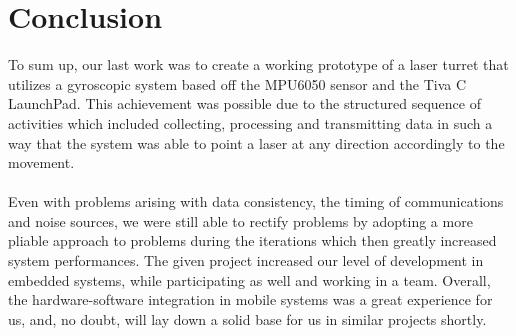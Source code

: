 \documentclass[12pt, a4paper]{article}
\begin{document}
\section{Conclusion}
To sum up, our last work was to create a working prototype of a laser turret that utilizes a gyroscopic system based off the MPU6050 sensor and the Tiva C LaunchPad. 
This achievement was possible due to the structured sequence of activities which included collecting, 
processing and transmitting data in such a way that the system was able to point a laser at any direction 
accordingly to the movement.
\\\\
Even with problems arising with data consistency, the timing of communications and noise sources, 
we were still able to rectify problems by adopting a more pliable approach to problems during the iterations 
which then greatly increased system performances. The given project increased our level of development in embedded systems, 
while participating as well and working in a team. Overall, the hardware-software integration in mobile systems was a great 
experience for us, and, no doubt, will lay down a solid base for us in similar projects shortly.
\end{document}
